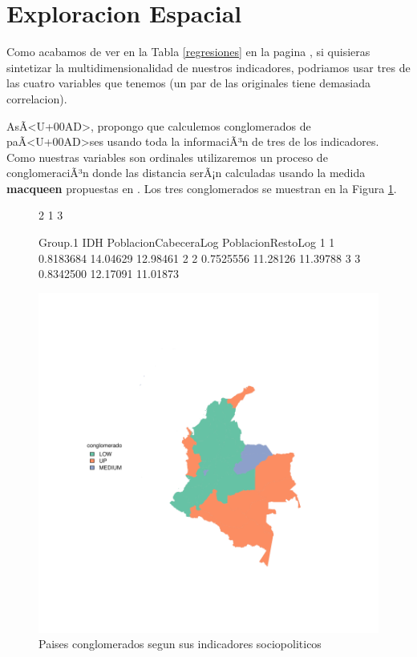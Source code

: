 \documentclass{article}
\begin{document}
\clearpage


\section{Exploracion Espacial}

Como acabamos de ver en la Tabla \ref{regresiones} en la pagina \pageref{regresiones}, si quisieras sintetizar la multidimensionalidad de nuestros indicadores, podriamos usar tres de las cuatro variables que tenemos (un par de las originales tiene demasiada correlacion). 

AsÃ<U+00AD>, propongo que calculemos conglomerados de paÃ<U+00AD>ses usando toda la informaciÃ³n de tres de los indicadores. Como nuestras variables son ordinales utilizaremos un proceso de conglomeraciÃ³n donde las distancia serÃ¡n calculadas usando la medida {\bf macqueen} propuestas en \cite{macqueen_methods_nodate}. Los tres conglomerados se muestran en la Figura \ref{clustmap}.




\begin{figure}[h]
\centering
\begin{Schunk}
\begin{Soutput}
[1] 2 1 3
\end{Soutput}
\begin{Soutput}
  Group.1       IDH PoblacionCabeceraLog PoblacionRestoLog
1       1 0.8183684             14.04629          12.98461
2       2 0.7525556             11.28126          11.39788
3       3 0.8342500             12.17091          11.01873
\end{Soutput}
\end{Schunk}
\includegraphics{Proyecto-plotMap1}
\caption{Paises conglomerados segun sus indicadores sociopoliticos}\label{clustmap}
\end{figure}


\renewcommand{\refname}{Bibliografia}

\end{document}
